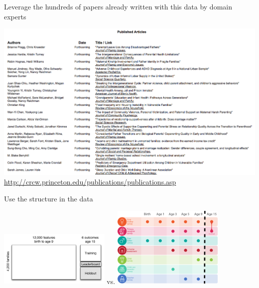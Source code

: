\documentclass{beamer}
\begin{document}
\begin{frame}

Leverage the hundreds of papers already written with this data by domain experts
\begin{center}
\includegraphics[width=\textwidth]{figures/ffPub1}\\
{\small \url{http://crcw.princeton.edu/publications/publications.asp}}
\end{center}

\end{frame}
\begin{frame}

Use the structure in the data\\
\pause
\begin{center}
\includegraphics[width=0.4\textwidth]{figures/ffc_design_matrix_ml} vs. \includegraphics[width=0.4\textwidth]{figures/ff_design_public2}
\end{center}

\end{frame}
\end{document}
